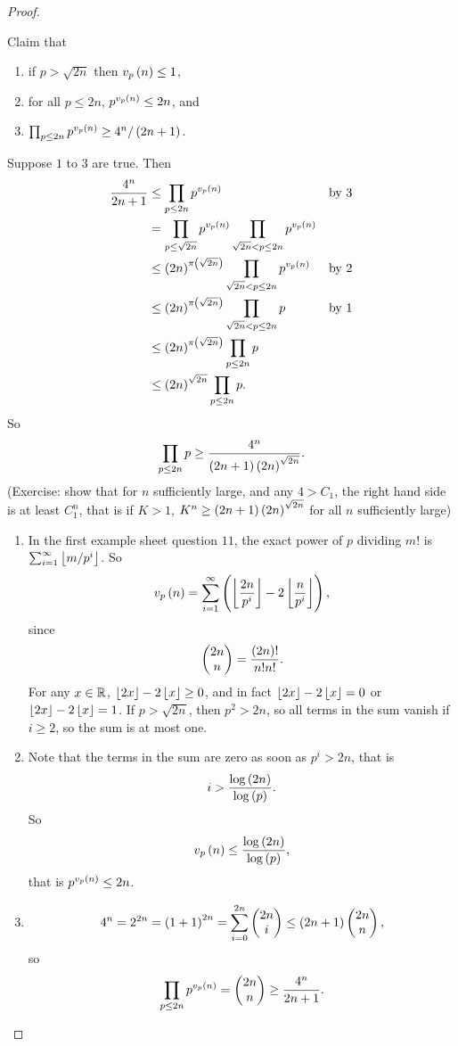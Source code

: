 \begin{proof}
\begin{itemize}
Claim that
\begin{enumerate}
\item if $ p > \sqrt{2n} $ then $ v_p\br{n} \le 1 $,
\item for all $ p \le 2n $, $ p^{v_p\br{n}} \le 2n $, and
\item $ \prod_{p \le 2n} p^{v_p\br{n}} \ge 4^n / \br{2n + 1} $.
\end{enumerate}
Suppose $ 1 $ to $ 3 $ are true. Then
\begin{align*}
\dfrac{4^n}{2n + 1}
& \le \prod_{p \le 2n} p^{v_p\br{n}} & \text{by} \ 3 \\
& = \prod_{p \le \sqrt{2n}} p^{v_p\br{n}} \prod_{\sqrt{2n} < p \le 2n} p^{v_p\br{n}} \\
& \le \br{2n}^{\pi\br{\sqrt{2n}}} \prod_{\sqrt{2n} < p \le 2n} p^{v_p\br{n}} & \text{by} \ 2 \\
& \le \br{2n}^{\pi\br{\sqrt{2n}}} \prod_{\sqrt{2n} < p \le 2n} p & \text{by} \ 1 \\
& \le \br{2n}^{\pi\br{\sqrt{2n}}} \prod_{p \le 2n} p \\
& \le \br{2n}^{\sqrt{2n}} \prod_{p \le 2n} p.
\end{align*}
So
$$ \prod_{p \le 2n} p \ge \dfrac{4^n}{\br{2n + 1}\br{2n}^{\sqrt{2n}}}. $$
(Exercise: show that for $ n $ sufficiently large, and any $ 4 > C_1 $, the right hand side is at least $ C_1^n $, that is if $ K > 1 $, $ K^n \ge \br{2n + 1}\br{2n}^{\sqrt{2n}} $ for all $ n $ sufficiently large)
\begin{enumerate}
\item In the first example sheet question $ 11 $, the exact power of $ p $ dividing $ m! $ is $ \sum_{i = 1}^\infty \left\lfloor m / p^i \right\rfloor $. So
$$ v_p\br{n} = \sum_{i = 1}^\infty \br{\fbr{\dfrac{2n}{p^i}} - 2\fbr{\dfrac{n}{p^i}}}, $$
since
$$ \twobyone{2n}{n} = \dfrac{\br{2n}!}{n!n!}. $$
For any $ x \in \mathbb{R} $, $ \left\lfloor 2x \right\rfloor - 2\left\lfloor x \right\rfloor \ge 0 $, and in fact $ \left\lfloor 2x \right\rfloor - 2\left\lfloor x \right\rfloor = 0 $ or $ \left\lfloor 2x \right\rfloor - 2\left\lfloor x \right\rfloor = 1 $. If $ p > \sqrt{2n} $, then $ p^2 > 2n $, so all terms in the sum vanish if $ i \ge 2 $, so the sum is at most one.
\item Note that the terms in the sum are zero as soon as $ p^i > 2n $, that is
$$ i > \dfrac{\log\br{2n}}{\log\br{p}}. $$
So
$$ v_p\br{n} \le \dfrac{\log\br{2n}}{\log\br{p}}, $$
that is $ p^{v_p\br{n}} \le 2n $.
\item
$$ 4^n = 2^{2n} = \br{1 + 1}^{2n} = \sum_{i = 0}^{2n} \twobyone{2n}{i} \le \br{2n + 1}\twobyone{2n}{n}, $$
so
$$ \prod_{p \le 2n} p^{v_p\br{n}} = \twobyone{2n}{n} \ge \dfrac{4^n}{2n + 1}. $$
\end{enumerate}


\end{itemize}
\end{proof}

